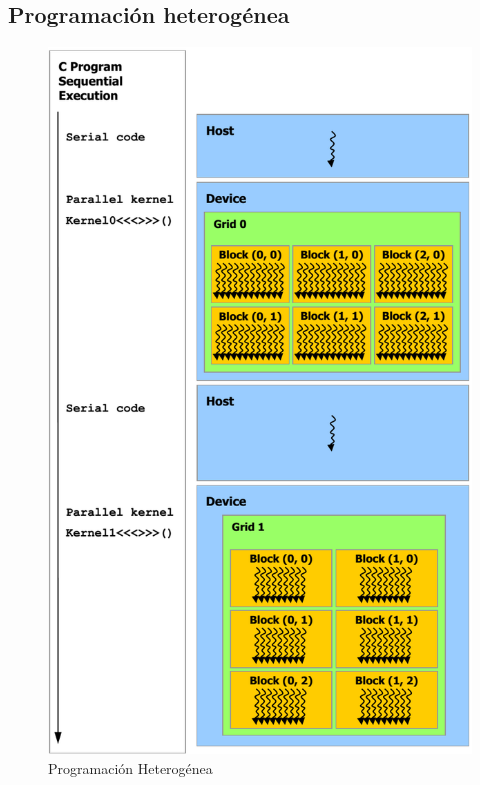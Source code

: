\subsection{Programación heterogénea}

\begin{figure}[h]
			\centering
				\includegraphics[scale=0.35]{img/PH.png}
			\caption{Programación Heterogénea}
\end{figure}

